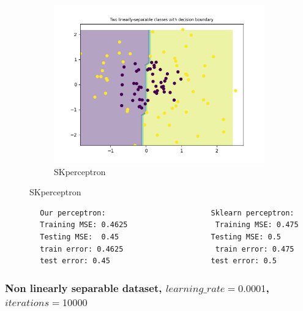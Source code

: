 \begin{figure}[ht]
\begin{subfigure}{0.4\textwidth}
            \includegraphics[width=\linewidth]{code/plots/SKperceptron_LR0.1_ITER5_dataset_load_non_linearly_separable_data}
            \caption{SKperceptron}
            \label{fig:image2}
        \end{subfigure}
        \label{fig:overall}
    \end{figure}

    \begin{verbatim}    
        Our perceptron:                        Sklearn perceptron:
        Training MSE: 0.4625                    Training MSE: 0.475
        Testing MSE:  0.45                     Testing MSE: 0.5
        train error: 0.4625                     train error: 0.475
        test error: 0.45                       test error: 0.5
    \end{verbatim}

    \subsubsection{Non linearly separable dataset, $learning\_rate=0.0001$, $iterations=10000$}


